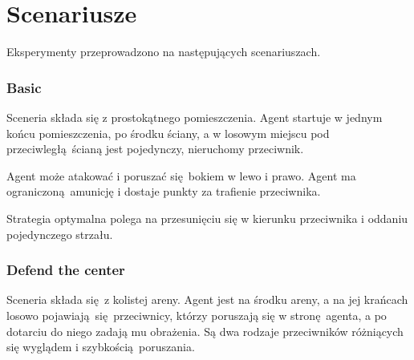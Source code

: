 \section{Scenariusze}
Eksperymenty przeprowadzono na następujących scenariuszach.

\subsubsection{Basic}\label{scenario_basic}
Sceneria składa się z prostokątnego pomieszczenia. Agent startuje w jednym końcu pomieszczenia, po środku ściany, a w losowym miejscu pod przeciwległą ścianą jest pojedynczy, nieruchomy przeciwnik.

Agent może atakować i poruszać się bokiem w lewo i prawo. Agent ma ograniczoną amunicję i dostaje punkty za trafienie przeciwnika.

Strategia optymalna polega na przesunięciu się w kierunku przeciwnika i oddaniu pojedynczego strzału.


\begin{figure}[H]
	\begin{floatrow}
	\end{floatrow}
\end{figure}

\subsubsection{Defend the center}\label{scenario_dtc}
Sceneria składa się z kolistej areny. Agent jest na środku areny, a na jej krańcach losowo pojawiają się przeciwnicy, którzy poruszają się w stronę agenta, a po dotarciu do niego zadają mu obrażenia. Są dwa rodzaje przeciwników różniących się wyglądem i szybkością poruszania.

